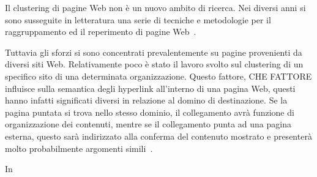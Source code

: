 


Il clustering di pagine Web non è un nuovo ambito di ricerca. Nei diversi anni si sono susseguite in letteratura una serie di tecniche e metodologie per il raggruppamento ed il reperimento di pagine Web~\cite{}. 


Tuttavia gli sforzi si sono concentrati prevalentemente su pagine provenienti da diversi siti Web. Relativamente poco è stato il lavoro svolto sul clustering di un specifico sito di una determinata organizzazione. \color{red}Questo fattore, CHE FATTORE \color{black}influisce sulla semantica degli hyperlink all'interno di una pagina Web, questi hanno infatti significati diversi in relazione al domino di destinazione. Se la pagina puntata si trova nello stesso dominio, il collegamento avrà funzione di organizzazione dei contenuti, mentre se il collegamento punta ad una pagina esterna, questo sarà indirizzato alla conferma del contenuto mostrato e presenterà molto probabilmente argomenti simili~\cite{}. 

In \cite{}




